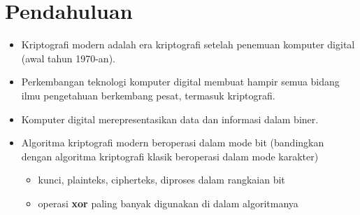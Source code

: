 \documentclass{article}
\begin{document}

\section*{Pendahuluan}

\begin{itemize}
    \item Kriptografi modern adalah era kriptografi setelah penemuan komputer digital (awal tahun 1970-an).
    \item Perkembangan teknologi komputer digital membuat hampir semua bidang ilmu pengetahuan berkembang pesat, termasuk kriptografi.
    \item Komputer digital merepresentasikan data dan informasi dalam biner.
    \item Algoritma kriptografi modern beroperasi dalam mode bit (bandingkan dengan algoritma kriptografi klasik beroperasi dalam mode karakter)
    \begin{itemize}
        \item kunci, plainteks, cipherteks, diproses dalam rangkaian bit
        \item operasi \textbf{xor} paling banyak digunakan di dalam algoritmanya
    \end{itemize}
\end{itemize}
\end{document}
